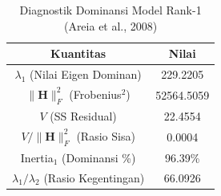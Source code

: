 \begin{table}[H]
\centering
\small
\caption{Diagnostik Dominansi Model Rank-1 (Areia et al., 2008)} \label{tab:appstruktur_diagnostik}
\begin{tabular}{|c|c|}
\hline
\textbf{Kuantitas} & \textbf{Nilai} \\
\hline
$\lambda_1$ (Nilai Eigen Dominan) & 229.2205 \\
$\|\mathbf{H}\|_F^2$ (Frobenius$^2$) & 52564.5059 \\
$V$ (SS Residual) & 22.4554 \\
$V / \|\mathbf{H}\|_F^2$ (Rasio Sisa) & 0.0004 \\
Inertia$_1$ (Dominansi \%) & 96.39\% \\
$\lambda_1 / \lambda_2$ (Rasio Kegentingan) & 66.0926 \\
\hline
\end{tabular}
\end{table}
